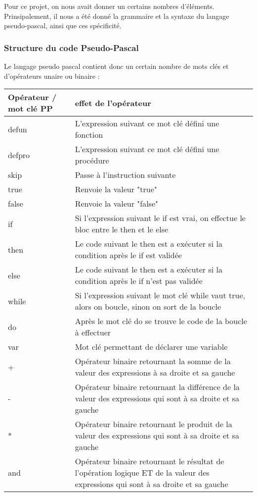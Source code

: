 \documentclass{article}
\begin{document}
Pour ce projet, on nous avait donner un certains nombres d'éléments. Prinsipalement, il nous a été donné la grammaire et la syntaxe du langage pseudo-pascal, ainsi que ces spécificité.

\subsubsection{Structure du code Pseudo-Pascal}

Le langage pseudo pascal contient donc un certain nombre de mots clés et d'opérateurs unaire ou binaire :

\begin{tabular}{|p{2cm}|p{11cm}|}
  \hline
  Opérateur / mot clé PP  & effet de l'opérateur \\
  \hline
  \hline
  defun & L'expression suivant ce mot clé défini une fonction\\ \hline
  defpro & L'expression suivant ce mot clé défini une procédure\\ \hline
  skip & Passe à l'instruction suivante\\ \hline
  true & Renvoie la valeur "true" \\ \hline
  false & Renvoie la valeur "false" \\ \hline
  if & Si l'expression suivant le if est vrai, on effectue le bloc entre le then et le else\\ \hline
  then & Le code suivant le then est a exécuter si la condition après le if est validée\\ \hline
  else & Le code suivant le then est a exécuter si la condition après le if n'est pas validée\\ \hline
  while & Si l'expression suivant le mot clé while vaut true, alors on boucle, sinon on sort de la boucle\\ \hline
  do & Après le mot clé do se trouve le code de la boucle à effectuer\\ \hline
  var & Mot clé permettant de déclarer une variable \\ \hline
  + & Opérateur binaire retournant la somme de la valeur des expressions à sa droite et sa gauche\\ \hline
  - & Opérateur binaire retournant la différence de la valeur des expressions qui sont à sa droite et sa gauche\\ \hline
  * & Opérateur binaire retournant le produit de la valeur des expressions qui sont à sa droite et sa gauche\\ \hline
  and & Opérateur binaire retournant le résultat de l'opération logique ET de la valeur des expressions qui sont à sa droite et sa gauche\\ \hline

\end{tabular}
\end{document}

